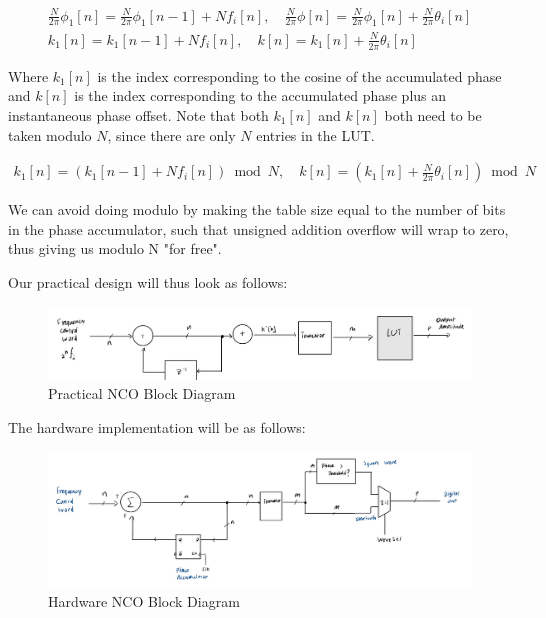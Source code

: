 \documentclass{article}
\begin{document}
        \begin{gather}
            \frac{N}{2 \pi} \phi_1[n] = \frac{N}{2 \pi} \phi_1[n - 1] + N f_i[n], \quad
            \frac{N}{2 \pi} \phi[n] = \frac{N}{2 \pi} \phi_1[n] + \frac{N}{2 \pi} \theta_i[n]
            \\
            k_1[n] = k_1[n - 1] + N f_i[n], \quad k[n] = k_1[n] + \frac{N}{2 \pi} \theta_i[n]
        \end{gather}
        
        Where $k_1[n]$ is the index corresponding to the cosine of the 
        accumulated phase and $k[n]$ is the index corresponding to the accumulated
        phase plus an instantaneous phase offset. Note that both $k_1[n]$ and
        $k[n]$ both need to be taken modulo $N$, since there are only $N$ 
        entries in the LUT.

        \begin{gather}
            k_1[n] = (k_1[n - 1] + N f_i[n]) \bmod N, \quad 
            k[n] = (k_1[n] + \frac{N}{2 \pi} \theta_i[n]) \bmod N
        \end{gather}
            
        We can avoid doing modulo by making the table size equal to the number
        of bits in the phase accumulator, such that unsigned addition overflow
        will wrap to zero, thus giving us modulo N "for free".

        \vspace{3mm}

        Our practical design will thus look as follows:
        
        \begin{figure}[!ht]
            \centering
            \includegraphics[width=\textwidth]{nco_bd_2.png}
            \caption{Practical NCO Block Diagram}
            \label{fig:fig2}
        \end{figure}
        
        The hardware implementation will be as follows:


        \begin{figure}[!ht]
            \centering
            \includegraphics[width=\textwidth]{nco_bd_3.png}
            \caption{Hardware NCO Block Diagram}
            \label{fig:fig3}
        \end{figure}
\end{document}
